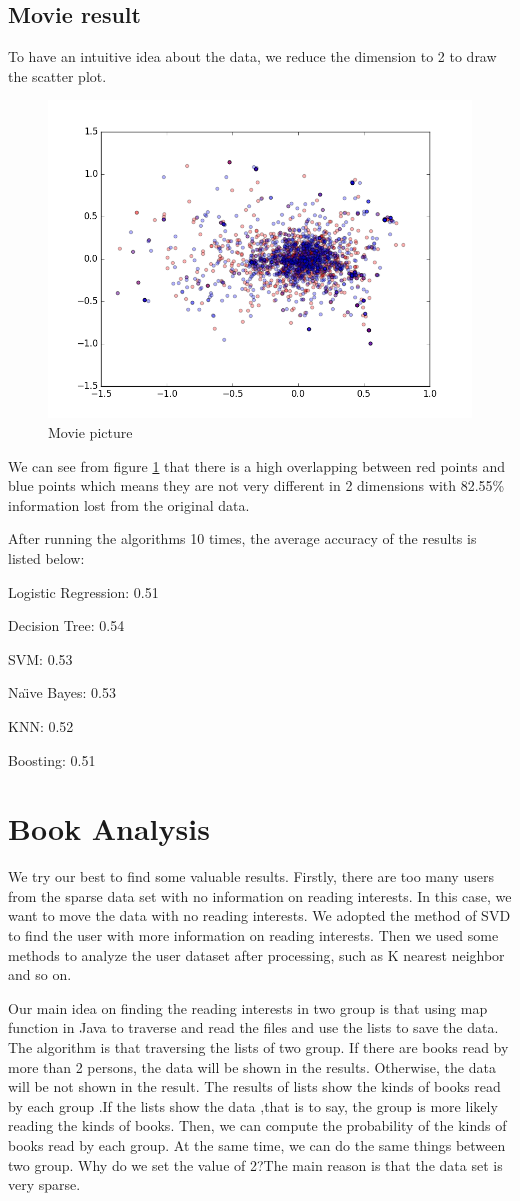 \documentclass[12pt]{article}
\begin{document}
\subsection{Movie result}

To have an intuitive idea about the data, we reduce the dimension to 2 to draw the scatter plot.

\begin{figure}[h]
  \centering
  \includegraphics[width=0.5\linewidth]{../MovieFollowInformation/2Dmappingwithoutfollow.png}
  \caption{Movie picture}
  \label{fig:movie}
\end{figure}

We can see from figure \ref{fig:movie} that there is a high overlapping between red points and blue points which means they are not very different in 2 dimensions with 82.55\% information lost from the original data.

After running the algorithms 10 times, the average accuracy of the results is listed below:

Logistic Regression: 0.51

Decision Tree: 0.54

SVM: 0.53

Na\"{\i}ve Bayes: 0.53

KNN: 0.52

Boosting: 0.51

\section{Book Analysis}

We try our best to find some valuable results. Firstly, there are too many users from the sparse data set with no information on reading interests. In this case, we want to move the data with no reading interests. We adopted the method of SVD to find the user with more information on reading interests. Then we used some methods to analyze the user dataset after processing, such as K nearest neighbor and so on.

Our main idea on finding the reading interests in two group is that using map function in Java to traverse and read the files and use the lists to save the data. The algorithm is that traversing  the lists of two group. If there are books read by more than 2 persons, the data will be shown in the results. Otherwise, the data will be not shown in the result. The results of lists show the kinds of  books read by each group .If the lists show the data ,that is to say, the group is more likely reading the kinds of books. Then, we can compute the probability of the kinds of books read by each group. At the same time, we can do the same things between two group. Why do we set the value of 2?The main reason is that the data set is very sparse.
\end{document}
